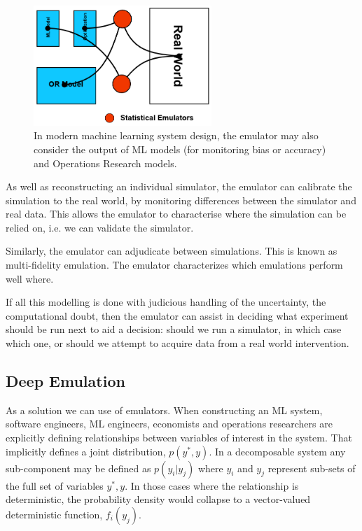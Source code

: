 \documentclass[a4paper]{caesar_book}
\begin{document}
\begin{figure}%
	\includegraphics[width=0.6\textwidth,keepaspectratio]{pictures/sim_4.PNG}%
	\caption*{In modern machine learning system design, the emulator may also consider the output of ML models (for monitoring bias or accuracy) and Operations Research models.}%
\end{figure}%

As well as reconstructing an individual simulator, the emulator can calibrate the simulation to the real world, by monitoring differences between the simulator and real data. This allows the emulator to characterise where the simulation can be relied on, i.e. we can validate the simulator.

Similarly, the emulator can adjudicate between simulations. This is known as multi-fidelity emulation. The emulator characterizes which emulations perform well where.

If all this modelling is done with judicious handling of the uncertainty, the computational doubt, then the emulator can assist in deciding what experiment should be run next to aid a decision: should we run a simulator, in which case which one, or should we attempt to acquire data from a real world intervention.

\subsection{Deep Emulation}

As a solution we can use of emulators. When constructing an ML system, software engineers, ML engineers, economists and operations researchers are explicitly defining relationships between variables of interest in the system. That implicitly defines a joint distribution, $p(y^{*},y)$. In a decomposable system any sub-component may be defined as $p(y_i|y_j)$ where $y_i$ and $y_j$ represent sub-sets of the full set of variables ${y^{*},y}$. In those cases where the relationship is deterministic, the probability density would collapse to a vector-valued deterministic function, $f_i(y_j)$.
\end{document}

